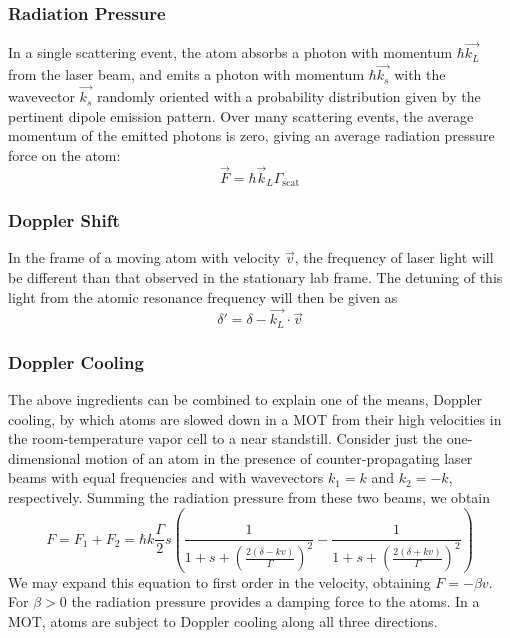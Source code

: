 \documentclass{../lab}
\begin{document}
\subsubsection{Radiation Pressure}

In a single scattering event, the atom absorbs a photon with momentum $\hbar\vec{k_L}$ from the laser beam, and emits a photon with momentum $\hbar\vec{k_s}$ with the wavevector $\vec{k_s}$ randomly oriented with a probability distribution given by the pertinent dipole emission pattern. Over many scattering events, the average momentum of the emitted photons is zero, giving an average radiation pressure force on the atom:
\begin{equation}
    \vec{F} = \hbar \vec{k}_L \Gamma_\text{scat}
\end{equation}

\subsubsection{Doppler Shift}

In the frame of a moving atom with velocity $\vec{v}$, the frequency of laser light will be different than that observed in the stationary lab frame. The detuning of this light from the atomic resonance frequency will then be given as
\begin{equation}
    \delta' = \delta - \vec{k_L}\cdot \vec{v}
\end{equation}

\subsubsection{Doppler Cooling}

The above ingredients can be combined to explain one of the means, Doppler cooling, by which atoms are slowed down in a MOT from their high velocities in the room-temperature vapor cell to a near standstill. Consider just the one-dimensional motion of an atom in the presence of counter-propagating laser beams with equal frequencies and with wavevectors $k_1 = k$ and $k_2 = -k$, respectively. Summing the radiation pressure from these two beams, we obtain
\begin{equation}
    F = F_1 + F_2 = \hbar k \frac{\Gamma}{2}s\left(\frac{1}{1+s+\left(\frac{2(\delta-kv)}{\Gamma}\right)^2}-\frac{1}{1+s+\left(\frac{2(\delta+kv)}{\Gamma}\right)^2}\right)
\end{equation}
We may expand this equation to first order in the velocity, obtaining $F = -\beta v$. For $\beta > 0$ the radiation pressure provides a damping force to the atoms. In a MOT, atoms are subject to Doppler cooling along all three directions.
\end{document}

